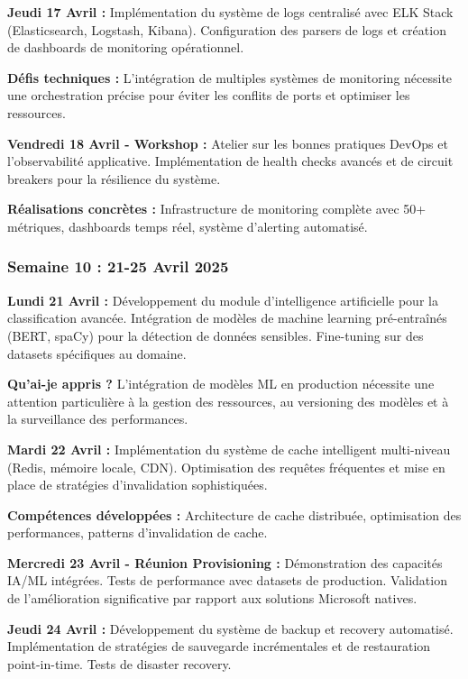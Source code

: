 \documentclass[a4paper,12pt]{article}
\begin{document}
\textbf{Jeudi 17 Avril :}
Implémentation du système de logs centralisé avec ELK Stack (Elasticsearch, Logstash, Kibana). Configuration des parsers de logs et création de dashboards de monitoring opérationnel.

\textbf{Défis techniques :} L'intégration de multiples systèmes de monitoring nécessite une orchestration précise pour éviter les conflits de ports et optimiser les ressources.

\textbf{Vendredi 18 Avril - Workshop :}
Atelier sur les bonnes pratiques DevOps et l'observabilité applicative. Implémentation de health checks avancés et de circuit breakers pour la résilience du système.

\textbf{Réalisations concrètes :} Infrastructure de monitoring complète avec 50+ métriques, dashboards temps réel, système d'alerting automatisé.

\subsubsection{Semaine 10 : 21-25 Avril 2025}

\textbf{Lundi 21 Avril :}
Développement du module d'intelligence artificielle pour la classification avancée. Intégration de modèles de machine learning pré-entraînés (BERT, spaCy) pour la détection de données sensibles. Fine-tuning sur des datasets spécifiques au domaine.

\textbf{Qu'ai-je appris ?} L'intégration de modèles ML en production nécessite une attention particulière à la gestion des ressources, au versioning des modèles et à la surveillance des performances.

\textbf{Mardi 22 Avril :}
Implémentation du système de cache intelligent multi-niveau (Redis, mémoire locale, CDN). Optimisation des requêtes fréquentes et mise en place de stratégies d'invalidation sophistiquées.

\textbf{Compétences développées :} Architecture de cache distribuée, optimisation des performances, patterns d'invalidation de cache.

\textbf{Mercredi 23 Avril - Réunion Provisioning :}
Démonstration des capacités IA/ML intégrées. Tests de performance avec datasets de production. Validation de l'amélioration significative par rapport aux solutions Microsoft natives.

\textbf{Jeudi 24 Avril :}
Développement du système de backup et recovery automatisé. Implémentation de stratégies de sauvegarde incrémentales et de restauration point-in-time. Tests de disaster recovery.
\end{document}

